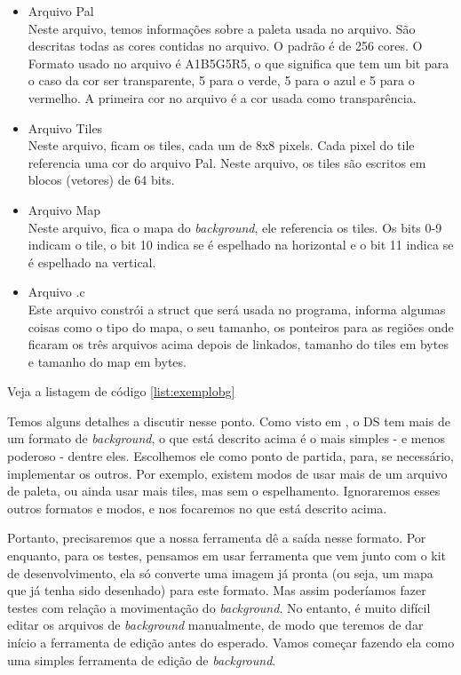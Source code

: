 \begin{itemize}
 \item Arquivo Pal\\
 Neste arquivo, temos informações sobre a paleta usada no arquivo. São descritas todas as cores contidas no arquivo. O padrão é de 256 cores. O Formato usado no arquivo é A1B5G5R5, o que significa que tem um bit para o caso da cor ser transparente, 5 para o verde, 5 para o azul e 5 para o vermelho. A primeira cor no arquivo é a cor usada como transparência.
 \item Arquivo Tiles\\
 Neste arquivo, ficam os tiles, cada um de 8x8 pixels. Cada pixel do tile referencia uma cor do arquivo Pal. Neste arquivo, os tiles são escritos em blocos (vetores) de 64 bits. 
 \item Arquivo Map\\
 Neste arquivo, fica o mapa do \textit{background}, ele referencia os tiles. Os bits 0-9 indicam o tile, o bit 10 indica se é espelhado na horizontal e o bit 11 indica se é espelhado na vertical.
 \item Arquivo .c\\
 Este arquivo constrói a struct que será usada no programa, informa algumas coisas como o tipo do mapa, o seu tamanho, os ponteiros para as regiões onde ficaram os três arquivos acima depois de linkados, tamanho do tiles em bytes e tamanho do map em bytes. 
\end{itemize}

Veja a listagem de código \ref{list:exemplobg}

Temos alguns detalhes a discutir nesse ponto. Como visto em \cite{DSSpec}, o DS tem mais de um formato de \textit{background}, o que está descrito acima é o mais simples - e menos poderoso - dentre eles. Escolhemos ele como ponto de partida, para, se necessário, implementar os outros. Por exemplo, existem modos de usar mais de um arquivo de paleta, ou ainda usar mais tiles, mas sem o espelhamento. Ignoraremos esses outros formatos e modos, e nos focaremos no que está descrito acima.

Portanto, precisaremos que a nossa ferramenta dê a saída nesse formato. Por enquanto, para os testes, pensamos em usar ferramenta que vem junto com o kit de desenvolvimento, ela só converte uma imagem já pronta (ou seja, um mapa que já tenha sido desenhado) para este formato. Mas assim poderíamos fazer testes com relação a movimentação do \textit{background}. No entanto, é muito difícil editar os arquivos de \textit{background} manualmente, de modo que teremos de dar início a ferramenta de edição antes do esperado. Vamos começar fazendo ela como uma simples ferramenta de edição de \textit{background}.

